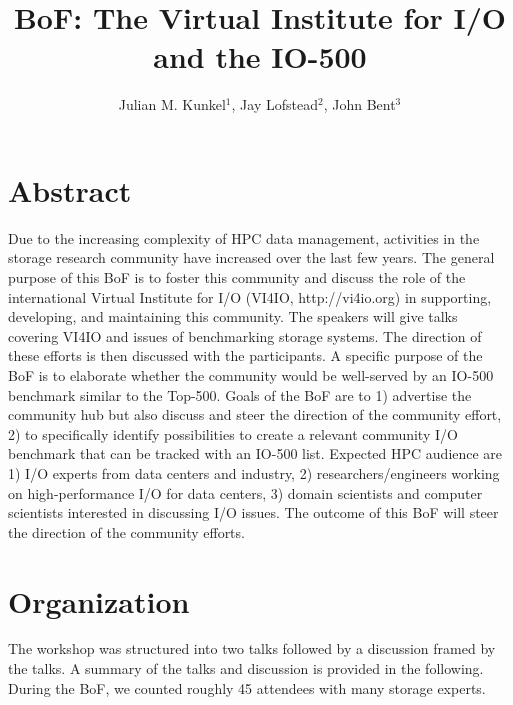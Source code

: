 \documentclass{llncs}
\begin{document}
\mainmatter


\author{Julian M. Kunkel$^1$, Jay Lofstead$^2$, John Bent$^3$} 

\title{BoF: The Virtual Institute for I/O and the IO-500}


\maketitle{}

\section{Abstract}


Due to the increasing complexity of HPC data management, activities in the storage research community have increased over the last few years. The general purpose of this BoF is to foster this community and discuss the role of the international Virtual Institute for I/O (VI4IO, http://vi4io.org) in supporting, developing, and maintaining this community.
The speakers will give talks covering VI4IO and issues of benchmarking storage systems. The direction of these efforts is then discussed with the participants. A specific purpose of the BoF is to elaborate whether the community would be well-served by an IO-500 benchmark similar to the Top-500.
Goals of the BoF are to 1) advertise the community hub but also discuss and steer the direction of the community effort, 2) to specifically identify possibilities to create a relevant community I/O benchmark that can be tracked with an IO-500 list.
Expected HPC audience are 1) I/O experts from data centers and industry, 2) researchers/engineers working on high-performance I/O for data centers, 3) domain scientists and computer scientists interested in discussing I/O issues.
The outcome of this BoF will steer the direction of the community efforts.


\section{Organization}


The workshop was structured into two talks followed by a discussion framed by the talks.
A summary of the talks and discussion is provided in the following.
During the BoF, we counted roughly 45 attendees with many storage experts.
\end{document}
